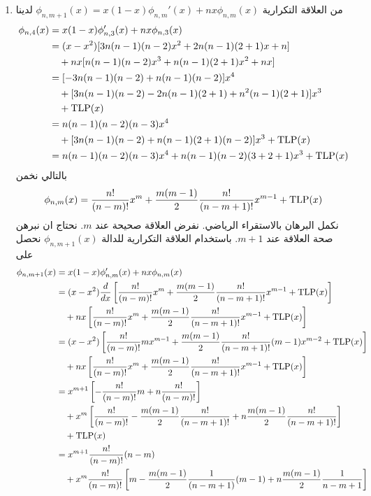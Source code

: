 \begin{enumerate}
	\item من العلاقة التكرارية $\phi_{n, m+1}(x) = x(1-x)\phi_{n, m}'(x) + nx\phi_{n, m}(x)$ لدينا
	\begin{align*}
		\phi_{n, 4}(x) &=  x(1-x)\phi_{n, 3}'(x) + nx\phi_{n, 3}(x)\\
		&= (x-x^2) [3n(n-1)(n-2)x^2 + 2n(n-1)(2+1)x + n]\\
		&\quad + nx [n(n-1)(n-2)x^3 + n(n-1)(2+1)x^2 + nx]\\
		&= [-3n(n-1)(n-2) + n(n-1)(n-2)]x^4\\
		&\quad + [3n(n-1)(n-2) -2n(n-1)(2+1) + n^2(n-1)(2+1)]x^3\\
		&\quad + \operatorname{TLP}(x)\\
		&= n(n-1)(n-2)(n-3)x^4\\
		& \quad + [3n(n-1)(n-2) + n(n-1)(2+1)(n-2)]x^3 + \operatorname{TLP}(x)\\
		&= n(n-1)(n-2)(n-3)x^4 + n(n-1)(n-2)(3+2+1)x^3 + \operatorname{TLP}(x)		
	\end{align*}
	بالتالي نخمن 
	\[
				\phi_{n, m}(x) = \dfrac{n!}{(n-m)!} x^m + \dfrac{m(m-1)}{2}\dfrac{n!}{(n-m+1)!} x^{m-1} + \operatorname{TLP}(x)
	\]
	\newpage
	نكمل البرهان بالاستقراء الرياضي. نفرض العلاقة صحيحة عند $m$. نحتاج ان نبرهن صحة العلاقة عند $m+1$. باستخدام العلاقة التكرارية للدالة $\phi_{n, m+1}(x)$ نحصل على
	\begingroup\small
	\begin{align*}
		\phi_{n, m+1}(x) &= x(1-x)\phi_{n, m}'(x) + nx\phi_{n, m}(x)\\
		&= (x-x^2) \frac{d}{dx} \left[\frac{n!}{(n-m)!}x^m + \frac{m(m-1)}{2} \frac{n!}{(n-m+1)!}x^{m-1} + \TLP(x)\right]\\
		& \quad + nx\left[\frac{n!}{(n-m)!}x^m + \frac{m(m-1)}{2} \frac{n!}{(n-m+1)!}x^{m-1} + \TLP(x)\right]\\
        &= (x-x^2) \left[\frac{n!}{(n-m)!}mx^{m-1} + \frac{m(m-1)}{2} \frac{n!}{(n-m+1)!}(m-1)x^{m-2} + \TLP(x)\right]\\
        & \quad + nx\left[\frac{n!}{(n-m)!}x^m + \frac{m(m-1)}{2} \frac{n!}{(n-m+1)!}x^{m-1} + \TLP(x)\right]\\
    &= x^{m+1} \left[-\frac{n!}{(n-m)!}m + n \frac{n!}{(n-m)!}\right]\\
    & \quad + x^m \left[\frac{n!}{(n-m)!} - \frac{m(m-1)}{2} \frac{n!}{(n-m+1)!} + n\frac{m(m-1)}{2} \frac{n!}{(n-m+1)!}\right]\\
    & \quad + \TLP(x)\\
    &= x^{m+1} \frac{n!}{(n-m)!}(n-m)\\
    & \quad + x^m \frac{n!}{(n-m)!}\left[m - \frac{m(m-1)}{2} \frac{1}{(n-m+1)} (m-1) + n \frac{m(m-1)}{2} \frac{1}{n-m+1}\right]\\

\end{align*}
\end{enumerate}
